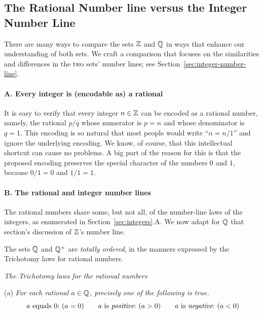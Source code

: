 \subsection{The Rational Number line versus the Integer Number Line}
\label{sec:Compare-Q-Z}

There are many ways to compare the sets $\mathbb{Z}$ and $\mathbb{Q}$ in ways that
enhance our understanding of both sets.  We craft a comparison that
focuses on the similarities and differences in the two sets' number
lines; see Section~\ref{sec:integer-number-line}.

\paragraph{\small\sf A. Every integer is (encodable as) a rational}

It is easy to verify that every integer $n \in \mathbb{Z}$ can be encoded as a
rational  number, namely, the rational
$p/q$ whose numerator is $p = n$ and whose denominator is $q = 1$.
This encoding is so natural that most people would write ``$n = n/1$''
and ignore the underlying encoding.  We know, of course, that this
intellectual shortcut can cause no problems.  A big part of the reason
for this is that the proposed encoding preserves the special character
of the numbers $0$ and $1$, because $0/1 = 0$ and $1/1 = 1$.

\paragraph{\small\sf B. The rational and integer number lines}

The rational numbers share some, but not all, of the number-line laws
of the integers, as enumerated in Section~\ref{sec:integers}.A.
We now adapt for $\mathbb{Q}$ that section's discussion of $\mathbb{Z}$'s number line.

\medskip

\noindent
The sets $\mathbb{Q}$ and $\mathbb{Q}^+$ are {\em totally ordered}, in the manners
expressed by the Trichotomy laws for rational numbers.


\medskip

\noindent
{\it The Trichotomy laws for the rational numbers}

\noindent (a)
%
{\it For each rational $a \in \mathbb{Q}$, precisely one of the following is true.}
\[
\mbox{ $a$ equals $0$:} \ (a=0) \ \ \ \
\ \mbox{ $a$ is {\em positive}:} \ (a>0) \ \ \ \
 \ \mbox{ $a$ is {\em negative}:} \ (a<0)
\]

